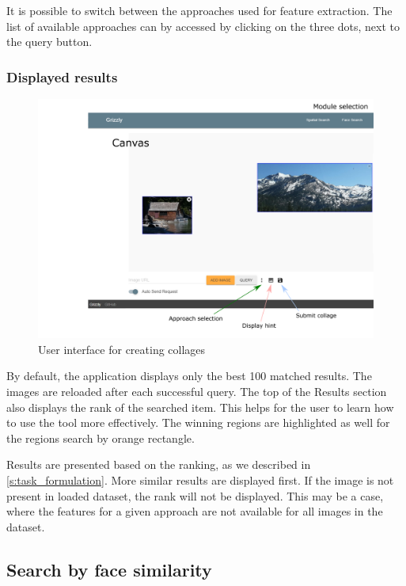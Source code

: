 It is possible to switch between the approaches used  for feature extraction. The list of available approaches can by accessed by clicking on the three dots, next to the query button.

\subsubsection*{Displayed results}

\begin{figure}
    \includegraphics[width=0.9\linewidth]{img/spatial_ui.png}
    \caption{User interface for creating collages}
    \label{fig:ui_collage}
\end{figure}

By default, the application displays only the best 100 matched results. The images are reloaded after each successful query. The top of the Results section also displays the rank of the searched item. This helps for the user to learn how to use the tool more effectively. The winning regions are highlighted as well for the regions search by orange rectangle.

Results are presented based on the ranking, as we described in \autoref{s:task_formulation}. More similar results are displayed first. If the image is not present in loaded dataset, the rank will not be displayed. This may be a case, where the features for a given approach are not available for all images in the dataset.

\subsection{Search by face similarity}

